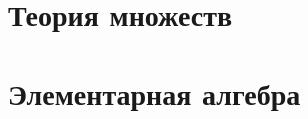 \documentclass{report}
\begin{document}
\chapter{Теория множеств}

	
	
	
	
\chapter{Элементарная алгебра}

	
	
\end{document}
